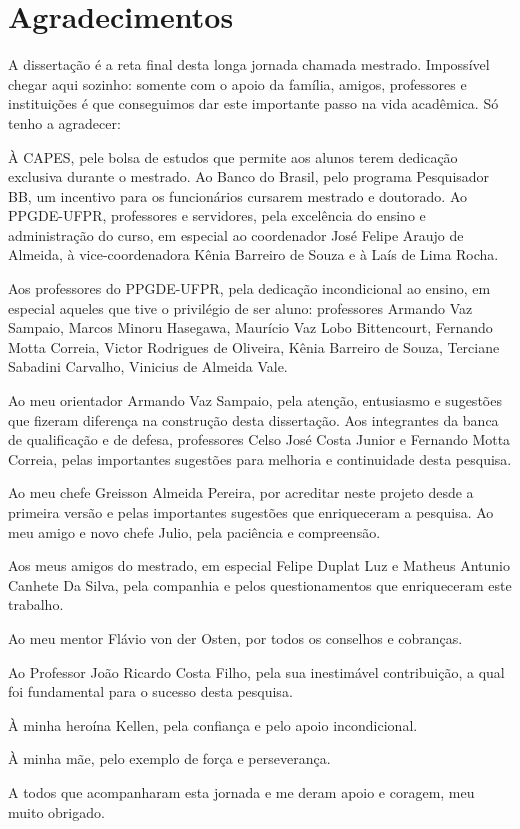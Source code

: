 \documentclass[../thesis.tex]{subfiles}
\begin{document}
	
	\newpage
	
	\section*{Agradecimentos} %
	
	\begin{spacing}{1.1}
		
	A dissertação é a reta final desta longa jornada chamada mestrado. Impossível chegar aqui sozinho: somente com o apoio da família, amigos, professores e instituições é que conseguimos dar este importante passo na vida acadêmica. Só tenho a agradecer:
	
	À CAPES, pele bolsa de estudos que permite aos alunos terem dedicação exclusiva durante o mestrado. Ao Banco do Brasil, pelo programa Pesquisador BB, um incentivo para os funcionários cursarem mestrado e doutorado. Ao PPGDE-UFPR, professores e servidores, pela excelência do ensino e administração do curso, em especial ao coordenador José Felipe Araujo de Almeida, à vice-coordenadora Kênia Barreiro de Souza e à Laís de Lima Rocha.

	Aos professores do PPGDE-UFPR, pela dedicação incondicional ao ensino, em especial aqueles que tive o privilégio de ser aluno: professores Armando Vaz Sampaio, Marcos Minoru Hasegawa, Maurício Vaz Lobo Bittencourt, Fernando Motta Correia, Victor Rodrigues de Oliveira, Kênia Barreiro de Souza, Terciane Sabadini Carvalho, Vinicius de Almeida Vale. %
	
	Ao meu orientador Armando Vaz Sampaio, pela atenção, entusiasmo e sugestões que fizeram diferença na construção desta dissertação. Aos integrantes da banca de qualificação e de defesa, professores Celso José Costa Junior e Fernando Motta Correia, pelas importantes sugestões para melhoria e continuidade desta pesquisa.

	Ao meu chefe Greisson Almeida Pereira, por acreditar neste projeto desde a primeira versão e pelas importantes sugestões que enriqueceram a pesquisa. Ao meu amigo e novo chefe Julio, pela paciência e compreensão.
	
	Aos meus amigos do mestrado, em especial Felipe Duplat Luz e Matheus Antunio Canhete Da Silva, pela companhia e pelos questionamentos que enriqueceram este trabalho.
	
	Ao meu mentor Flávio von der Osten, por todos os conselhos e cobranças.
	
	Ao Professor João Ricardo Costa Filho, pela sua inestimável contribuição, a qual foi fundamental para o sucesso desta pesquisa.
	
	À minha heroína Kellen, pela confiança e pelo apoio incondicional.
	
	À minha mãe, pelo exemplo de força e perseverança.
	
	A todos que acompanharam esta jornada e me deram apoio e coragem, meu muito obrigado.
	
	\end{spacing}
	
	\thispagestyle{empty}
\end{document}

